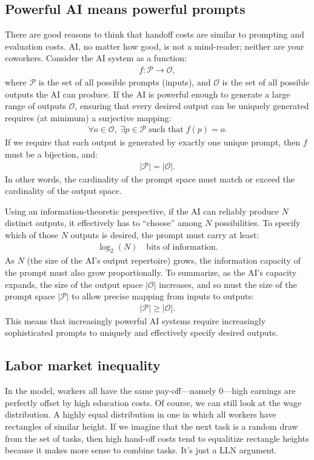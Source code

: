 \documentclass{article}
\begin{document}
\subsection{Powerful AI means powerful prompts}
There are good reasons to think that handoff costs are similar to prompting and evaluation costs.
AI, no matter how good, is not a mind-reader; neither are your coworkers.
Consider the AI system as a function:
\begin{align}
f : \mathcal{P} \longrightarrow \mathcal{O},
\end{align}
where $\mathcal{P}$ is the set of all possible prompts (inputs), and $\mathcal{O}$ is the set of all possible outputs the AI can produce.
If the AI is powerful enough to generate a large range of outputs $\mathcal{O}$, ensuring that every desired output can be uniquely generated requires (at minimum) a surjective mapping:
\begin{align}
\forall o \in \mathcal{O}, \; \exists p \in \mathcal{P} \; \text{such that} \; f(p) = o.
\end{align}
If we require that each output is generated by exactly one unique prompt, then $f$ must be a bijection, and:
\begin{align}
|\mathcal{P}| = |\mathcal{O}|.
\end{align}
In other words, the cardinality of the prompt space must match or exceed the cardinality of the output space.

Using an information-theoretic perspective, if the AI can reliably produce $N$ distinct outputs, it effectively has to ``choose'' among $N$ possibilities. 
To specify which of those $N$ outputs is desired, the prompt must carry at least:
\begin{align}
\log_2(N) \quad \text{bits of information.}
\end{align}
As $N$ (the size of the AI's output repertoire) grows, the information capacity of the prompt must also grow proportionally.
To summarize, as the AI’s capacity expands, the size of the output space $|\mathcal{O}|$ increases, and so must the size of the prompt space $|\mathcal{P}|$ to allow precise mapping from inputs to outputs:
\begin{align}
|\mathcal{P}| \geq |\mathcal{O}|.
\end{align}
This means that increasingly powerful AI systems require increasingly sophisticated prompts to uniquely and effectively specify desired outputs.

\subsection{Labor market inequality}
In the model, workers all have the same pay-off---namely $0$---high earnings are perfectly offset by high education costs.
Of course, we can still look at the wage distribution.
A highly equal distribution in one in which all workers have rectangles of similar height.
If we imagine that the next task is a random draw from the set of tasks, then high hand-off costs tend to equalitize rectangle heights because it makes more sense to combine tasks. 
It's just a LLN argument.
\end{document}
